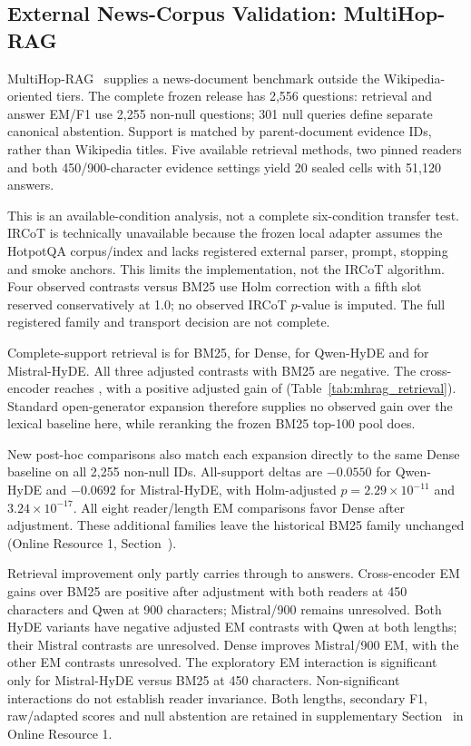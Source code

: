 \subsection{External News-Corpus Validation: MultiHop-RAG}
\label{sec:mhrag_external}

MultiHop-RAG~\cite{tang2024multihoprag} supplies a news-document benchmark outside the Wikipedia-oriented tiers. The complete frozen release has 2,556 questions: retrieval and answer EM/F1 use 2,255 non-null questions; 301 null queries define separate canonical abstention. Support is matched by parent-document evidence IDs, rather than Wikipedia titles. Five available retrieval methods, two pinned readers and both 450/900-character evidence settings yield 20 sealed cells with 51,120 answers.

This is an available-condition analysis, not a complete six-condition transfer test. IRCoT is technically unavailable because the frozen local adapter assumes the HotpotQA corpus/index and lacks registered external parser, prompt, stopping and smoke anchors. This limits the implementation, not the IRCoT algorithm. Four observed contrasts versus BM25 use Holm correction with a fifth slot reserved conservatively at 1.0; no observed IRCoT $p$-value is imputed. The full registered family and transport decision are not complete.



Complete-support retrieval is \MHRBMAll{} for BM25, \MHRDenseAll{} for Dense, \MHRQAll{} for Qwen-HyDE and \MHRMAll{} for Mistral-HyDE. All three adjusted contrasts with BM25 are negative. The cross-encoder reaches \MHRCEAll{}, with a positive adjusted gain of \MHRCEGain{} (Table~\ref{tab:mhrag_retrieval}). Standard open-generator expansion therefore supplies no observed gain over the lexical baseline here, while reranking the frozen BM25 top-100 pool does.

New post-hoc comparisons also match each expansion directly to the same Dense baseline on all 2,255 non-null IDs. All-support deltas are $-0.0550$ for Qwen-HyDE and $-0.0692$ for Mistral-HyDE, with Holm-adjusted $p=2.29\times10^{-11}$ and $3.24\times10^{-17}$. All eight reader/length EM comparisons favor Dense after adjustment. These additional families leave the historical BM25 family unchanged (Online Resource 1, Section~).

Retrieval improvement only partly carries through to answers. Cross-encoder EM gains over BM25 are positive after adjustment with both readers at 450 characters and Qwen at 900 characters; Mistral/900 remains unresolved. Both HyDE variants have negative adjusted EM contrasts with Qwen at both lengths; their Mistral contrasts are unresolved. Dense improves Mistral/900 EM, with the other EM contrasts unresolved. The exploratory EM interaction is significant only for Mistral-HyDE versus BM25 at 450 characters. Non-significant interactions do not establish reader invariance. Both lengths, secondary F1, raw/adapted scores and null abstention are retained in supplementary Section~ in Online Resource 1.

